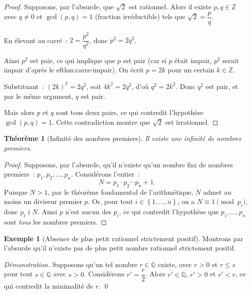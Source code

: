 \documentclass[12pt,a4paper,openany]{book}
\theoremstyle{definition}
\newtheorem{exemple}[definition]{Exemple}
\theoremstyle{plain}
\newtheorem{theoreme}[definition]{Théorème}
\theoremstyle{remark}
\newcommand{\Z}{\mathbb{Z}}
\newcommand{\Q}{\mathbb{Q}}
\newcommand{\set}[1]{\left\{#1\right\}}
\begin{document}
\begin{proof}
  Supposons, par l'absurde, que $\sqrt{2}$ est rationnel. Alors il existe $p, q \in \Z$ avec $q \neq 0$ et $\gcd(p,q) = 1$ (fraction irr\'eductible) tels que $\sqrt{2} = \dfrac{p}{q}$.

  En \'elevant au carr\'e~: $2 = \dfrac{p^2}{q^2}$, donc $p^2 = 2q^2$.

  Ainsi $p^2$ est pair, ce qui implique que $p$ est pair (car si $p$ \'etait impair, $p^2$ serait impair d'apr\`es le 
ef{thm:carre-impair}). On \'ecrit $p = 2k$ pour un certain $k \in \Z$.

  Substituant~: $(2k)^2 = 2q^2$, soit $4k^2 = 2q^2$, d'o\`u $q^2 = 2k^2$. Donc $q^2$ est pair, et par le m\^eme argument, $q$ est pair.

  Mais alors $p$ et $q$ sont tous deux pairs, ce qui contredit l'hypoth\`ese $\gcd(p,q) = 1$. Cette contradiction montre que $\sqrt{2}$ est irrationnel.
\end{proof}

\begin{theoreme}[Infinit\'e des nombres premiers]\label{thm:inf-premiers}
  Il existe une infinit\'e de nombres premiers.
\end{theoreme}

\begin{proof}
  Supposons, par l'absurde, qu'il n'existe qu'un nombre fini de nombres premiers~: $p_1, p_2, \dots, p_n$. Consid\'erons l'entier~:
  \[
    N = p_1 \cdot p_2 \cdots p_n + 1.
  \]
  Puisque $N > 1$, par le th\'eor\`eme fondamental de l'arithm\'etique, $N$ admet au moins un diviseur premier $p$. Or, pour tout $i \in \set{1, \dots, n}$, on a $N \equiv 1 \pmod{p_i}$, donc $p_i \nmid N$. Ainsi $p$ n'est aucun des $p_i$, ce qui contredit l'hypoth\`ese que $p_1, \dots, p_n$ sont \emph{tous} les nombres premiers.
\end{proof}

\begin{exemple}[Absence de plus petit rationnel strictement positif]\label{ex:pas-plus-petit-rationnel}
  Montrons par l'absurde qu'il n'existe pas de plus petit nombre rationnel strictement positif.

  \smallskip
  \noindent\textit{D\'emonstration.} Supposons qu'un tel nombre $r \in \Q$ existe, avec $r > 0$ et $r \leq s$ pour tout $s \in \Q$ avec $s > 0$. Consid\'erons $r' = \dfrac{r}{2}$. Alors $r' \in \Q$, $r' > 0$ et $r' < r$, ce qui contredit la minimalit\'e de $r$. \qed
\end{exemple}
\end{document}
